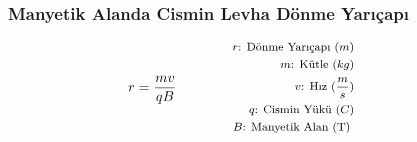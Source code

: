 \subsubsection*{Manyetik Alanda Cismin Levha Dönme Yarıçapı}
\begin{equation}
    r = \frac{m v}{q B} \qquad \qquad \parbox{4cm}{\footnotesize$\begin{aligned}
        r\text{: Dönme Yarıçapı } (m) \\
        m\text{: Kütle } (kg) \\
        v\text{: Hız } (\frac{m}{s}) \\
        q\text{: Cismin Yükü } (C) \\
        B\text{: Manyetik Alan (T) }
\end{aligned}$}
\end{equation}
